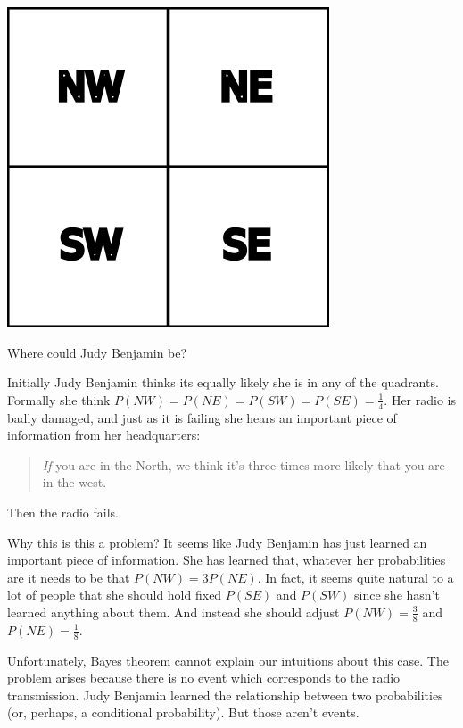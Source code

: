 \begin{marginfigure}
\centering
\includegraphics[width=\textwidth]{JudyBenjamin.png}
\caption{Where could Judy Benjamin be?}
\label{f:judybenjamin}
\end{marginfigure}

Initially Judy Benjamin thinks its equally likely she is in any of the quadrants.  Formally she think $P(NW) = P(NE) = P(SW) = P(SE) = \frac{1}{4}$.  Her radio is badly damaged, and just as it is failing she hears an important piece of information from her headquarters:
\begin{quote}
{\it If} you are in the North, we think it's three times more likely that you are in the west.  
\end{quote}
Then the radio fails.

Why this is this a problem? It seems like Judy Benjamin has just learned an important piece of information. She has learned that, whatever her probabilities are it needs to be that $P(NW) = 3 P(NE)$. In fact, it seems quite natural to a lot of people that she should hold fixed $P(SE)$ and $P(SW)$ since she hasn't learned anything about them.  And instead she should adjust $P(NW) = \frac{3}{8}$ and $P(NE) = \frac{1}{8}$.

Unfortunately, Bayes theorem cannot explain our intuitions about this case.  The problem arises because there is no event which corresponds to the radio transmission. Judy Benjamin learned the relationship between two probabilities (or, perhaps, a conditional probability).  But those aren't events.

